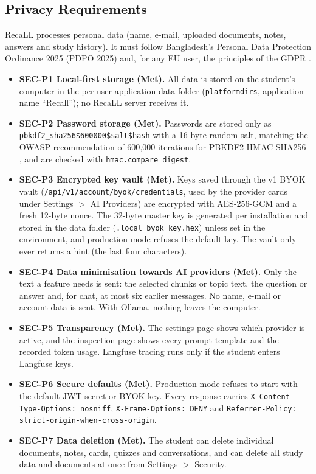 \subsection{Privacy Requirements}

RecaLL processes personal data (name, e-mail, uploaded documents, notes, answers and study
history). It must follow Bangladesh's Personal Data Protection Ordinance 2025 (PDPO 2025) \cite{pdpo2025} and,
for any EU user, the principles of the GDPR \cite{gdpr2016}.

\begin{itemize}
  \item \textbf{SEC-P1 Local-first storage (Met).} All data is stored on the student's computer in
  the per-user application-data folder (\texttt{platformdirs}, application name ``Recall''); no
  RecaLL server receives it.
  \item \textbf{SEC-P2 Password storage (Met).} Passwords are stored only as
  \texttt{pbkdf2\_sha256\$600000\$salt\$hash} with a 16-byte random salt, matching the OWASP
  recommendation of 600{,}000 iterations for PBKDF2-HMAC-SHA256 \cite{owaspPassword}, and are
  checked with \texttt{hmac.compare\_digest}.
  \item \textbf{SEC-P3 Encrypted key vault (Met).} Keys saved through the v1 BYOK vault
  (\texttt{/api/v1/account/byok/credentials}, used by the provider cards under Settings $>$ AI
  Providers) are encrypted with AES-256-GCM and a fresh 12-byte nonce. The 32-byte master key is
  generated per installation and stored in the data folder (\texttt{.local\_byok\_key.hex}) unless
  set in the environment, and production mode refuses the default key. The vault only ever returns
  a hint (the last four characters).
  \item \textbf{SEC-P4 Data minimisation towards AI providers (Met).} Only the text a feature needs
  is sent: the selected chunks or topic text, the question or answer and, for chat, at most six
  earlier messages. No name, e-mail or account data is sent. With Ollama, nothing leaves the
  computer.
  \item \textbf{SEC-P5 Transparency (Met).} The settings page shows which provider is active, and
  the inspection page shows every prompt template and the recorded token usage. Langfuse tracing
  runs only if the student enters Langfuse keys.
  \item \textbf{SEC-P6 Secure defaults (Met).} Production mode refuses to start with the default
  JWT secret or BYOK key. Every response carries \texttt{X-Content-Type-Options: nosniff},
  \texttt{X-Frame-Options: DENY} and \texttt{Referrer-Policy:} \texttt{strict-origin-}\allowbreak\texttt{when-cross-origin}.
  \item \textbf{SEC-P7 Data deletion (Met).} The student can delete individual documents, notes,
  cards, quizzes and conversations, and can delete all study data and documents at once from
  Settings $>$ Security.
\end{itemize}

